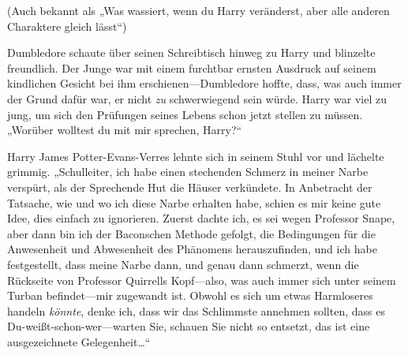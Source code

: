 (Auch bekannt als „Was wassiert, wenn du Harry veränderst, aber alle anderen Charaktere gleich lässt“)

Dumbledore schaute über seinen Schreibtisch hinweg zu Harry und blinzelte freundlich. Der Junge war mit einem furchtbar ernsten Ausdruck auf seinem kindlichen Gesicht bei ihm erschienen—Dumbledore hoffte, dass, was auch immer der Grund dafür war, er nicht \emph{zu} schwerwiegend sein würde. Harry war viel zu jung, um sich den Prüfungen seines Lebens schon jetzt stellen zu müssen. „Worüber wolltest du mit mir sprechen, Harry?“

Harry James Potter-Evans-Verres lehnte sich in seinem Stuhl vor und lächelte grimmig. „Schulleiter, ich habe einen stechenden Schmerz in meiner Narbe verspürt, als der Sprechende Hut die Häuser verkündete. In Anbetracht der Tatsache, wie und wo ich diese Narbe erhalten habe, schien es mir keine gute Idee, dies einfach zu ignorieren. Zuerst dachte ich, es sei wegen Professor Snape, aber dann bin ich der Baconschen Methode gefolgt, die Bedingungen für die Anwesenheit und Abwesenheit des Phänomens herauszufinden, und ich habe festgestellt, dass meine Narbe dann, und genau dann schmerzt, wenn die Rückseite von Professor Quirrells Kopf—also, was auch immer sich unter seinem Turban befindet—mir zugewandt ist. Obwohl es sich um etwas Harmloseres handeln \emph{könnte}, denke ich, dass wir das Schlimmste annehmen sollten, dass es Du-weißt-schon-wer—warten Sie, schauen Sie nicht so entsetzt, das ist eine ausgezeichnete Gelegenheit…“






